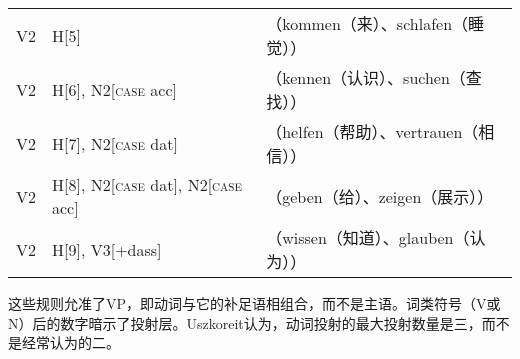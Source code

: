 \ea
\label{gpsg-regeln}
\begin{tabular}[t]{@{}l@{~$\to$~}l@{~~}l@{}}
V2  & H[5]                                    & （kommen（来）、schlafen（睡觉））\\
V2  & H[6], N2[\textsc{case} acc]                &（kennen（认识）、suchen（查找））\\
V2  & H[7], N2[\textsc{case} dat]                &（helfen（帮助）、vertrauen（相信））\\
V2  & H[8], N2[\textsc{case} dat], N2[\textsc{case} acc]  &（geben（给）、zeigen（展示））\\
V2  & H[9], V3[+dass]                         &（wissen（知道）、glauben（认为））\\
\end{tabular}
\z
%
这些规则允准了VP，即动词与它的补足语相组合，而不是主语。词类符号（V或N）后的数字暗示了\xbarc 投射层。Uszkoreit认为，动词投射的最大投射数量是三，而不是经常认为的二。

